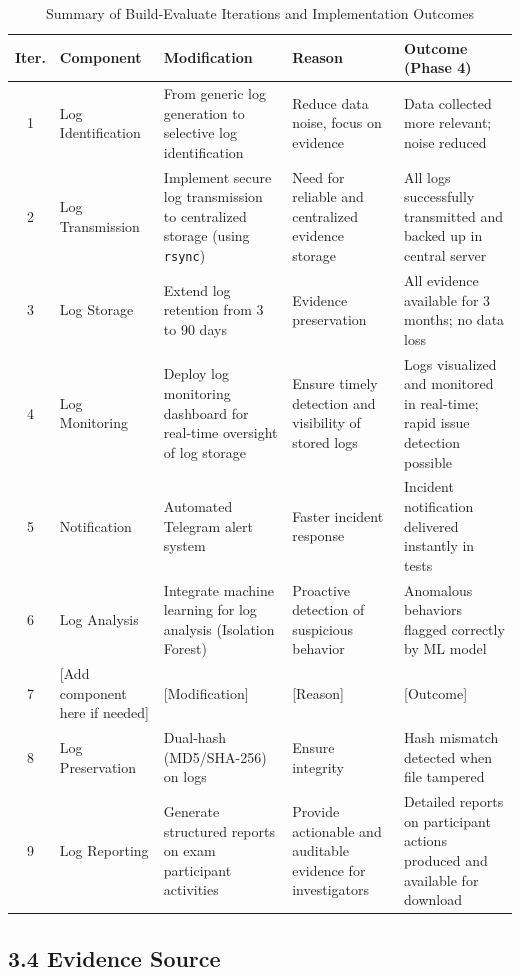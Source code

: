 \begin{table}[ht]
	\caption{Summary of Build-Evaluate Iterations and Implementation Outcomes}
	\centering
	\begin{tabular}{|c|l|l|l|l|}
		\hline
		\textbf{Iter.} & \textbf{Component} & \textbf{Modification} & \textbf{Reason} & \textbf{Outcome (Phase 4)} \\ \hline
		1 & Log Identification & From generic log generation to selective log identification & Reduce data noise, focus on evidence & Data collected more relevant; noise reduced \\
		2 & Log Transmission & Implement secure log transmission to centralized storage (using \texttt{rsync}) & Need for reliable and centralized evidence storage & All logs successfully transmitted and backed up in central server \\
		3 & Log Storage & Extend log retention from 3 to 90 days & Evidence preservation & All evidence available for 3 months; no data loss \\
		4 & Log Monitoring & Deploy log monitoring dashboard for real-time oversight of log storage & Ensure timely detection and visibility of stored logs & Logs visualized and monitored in real-time; rapid issue detection possible \\
		5 & Notification & Automated Telegram alert system & Faster incident response & Incident notification delivered instantly in tests \\
		6 & Log Analysis & Integrate machine learning for log analysis (Isolation Forest) & Proactive detection of suspicious behavior & Anomalous behaviors flagged correctly by ML model \\
		7 & [Add component here if needed] & [Modification] & [Reason] & [Outcome] \\
		8 & Log Preservation & Dual-hash (MD5/SHA-256) on logs & Ensure integrity & Hash mismatch detected when file tampered \\
		9 & Log Reporting & Generate structured reports on exam participant activities & Provide actionable and auditable evidence for investigators & Detailed reports on participant actions produced and available for download \\
		\hline
	\end{tabular}
	\label{tab:build_eval}
\end{table}

\subsection{3.4 Evidence Source}

